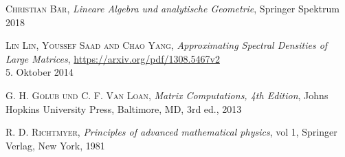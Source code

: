 
\begin{thebibliography}{56}

    \textsc{Christian Bär},
    \textit{Lineare Algebra und analytische Geometrie},
    Springer Spektrum
    2018
    
    \textsc{Lin Lin, Youssef Saad and Chao Yang},
    \textit{Approximating Spectral Densities of Large Matrices},
    \url{https://arxiv.org/pdf/1308.5467v2}\\
    5. Oktober 2014

    \textsc{G. H. Golub und C. F. Van Loan},
    \textit{Matrix Computations, 4th Edition},
    Johns Hopkins University Press,
    Baltimore, MD, 3rd ed.,
    2013

    \textsc{R. D. Richtmyer},
    \textit{Principles of advanced mathematical physics},
    vol 1, Springer Verlag,
    New York,
    1981
  
\end{thebibliography}